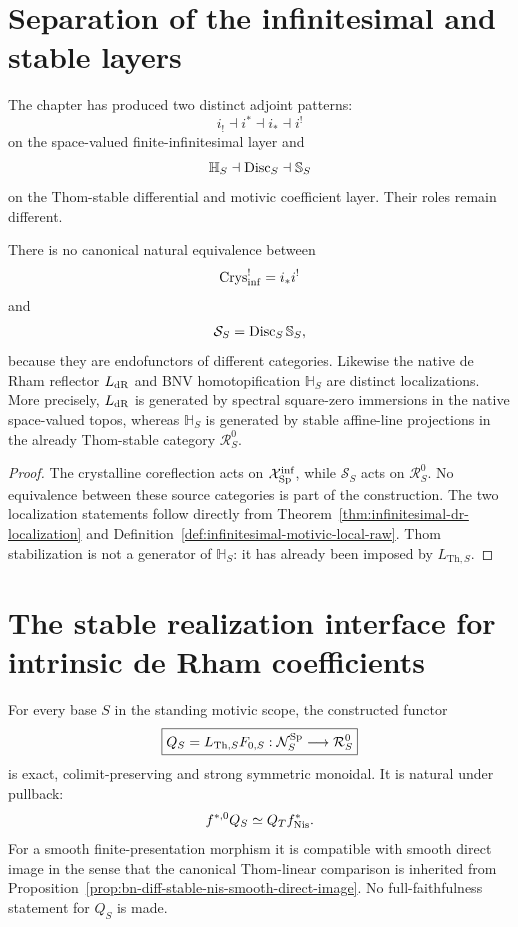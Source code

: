 \section{Separation of the infinitesimal and stable layers}
\label{sec:infinitesimal-layer-separation}

The chapter has produced two distinct adjoint patterns:
\[
  i_!\dashv i^*\dashv i_*\dashv i^!
\]
on the space-valued finite-infinitesimal layer and
\[
  \mathbb H_S\dashv\operatorname{Disc}_S\dashv\mathbb S_S
\]
on the Thom-stable differential and motivic coefficient layer.  Their roles
remain different.

\begin{proposition}
\label{prop:infinitesimal-nonidentification}
There is no canonical natural equivalence between
\[
  \operatorname{Crys}^{!}_{\mathrm{inf}}=i_*i^!
\]
and
\[
  \mathcal S_S=\operatorname{Disc}_S\mathbb S_S,
\]
because they are endofunctors of different categories.  Likewise the native
de Rham reflector \(L_{\mathrm{dR}}\) and BNV homotopification \(\mathbb H_S\) are
distinct localizations.  More precisely, \(L_{\mathrm{dR}}\) is generated by spectral
square-zero immersions in the native space-valued topos, whereas \(\mathbb H_S\)
is generated by stable affine-line projections in the already Thom-stable
category \(\mathcal R_S^0\).
\end{proposition}

\begin{proof}
The crystalline coreflection acts on
\(\mathcal X_{\mathrm{Sp}}^{\mathrm{inf}}\), while \(\mathcal S_S\) acts on
\(\mathcal R_S^0\).  No equivalence between these source categories is part of
the construction.  The two localization statements follow directly from
Theorem~\ref{thm:infinitesimal-dr-localization} and
Definition~\ref{def:infinitesimal-motivic-local-raw}.  Thom stabilization is
not a generator of \(\mathbb H_S\): it has already been imposed by
\(L_{\mathrm{Th},S}\).
\end{proof}

\section{The stable realization interface for intrinsic de Rham coefficients}
\label{sec:bn-diff-realization-interface}

\begin{proposition}
\label{prop:bn-diff-stable-realization-interface}
For every base \(S\) in the standing motivic scope, the constructed functor
\[
  \boxed{
  Q_S=L_{\mathrm{Th},S}F_{0,S}:
  \mathcal N_S^{\mathrm{Sp}}
  \longrightarrow
  \mathcal R_S^0
  }
\]
is exact, colimit-preserving and strong symmetric monoidal.  It is natural
under pullback:
\[
  f^{*,0}Q_S\simeq Q_Tf^*_{\mathrm{Nis}}.
\]
For a smooth finite-presentation morphism it is compatible with smooth direct
image in the sense that the canonical Thom-linear comparison is inherited from
Proposition~\ref{prop:bn-diff-stable-nis-smooth-direct-image}.
No full-faithfulness statement for \(Q_S\) is made.
\end{proposition}

